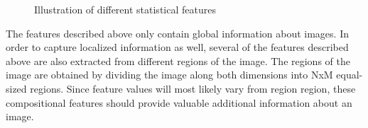\begin{figure}[!h]
\begin{center}

  \end{center}
  \caption{Illustration of different statistical features}
  \label{featureImg}
\end{figure}


The features described above only contain global information about images. In order to capture localized information as well, several of the features described above are also extracted from different regions of the image. The regions of the image are obtained by dividing the image along both dimensions into NxM equal-sized regions. Since feature values will most likely vary from region region, these compositional features should provide valuable additional information about an image. 

